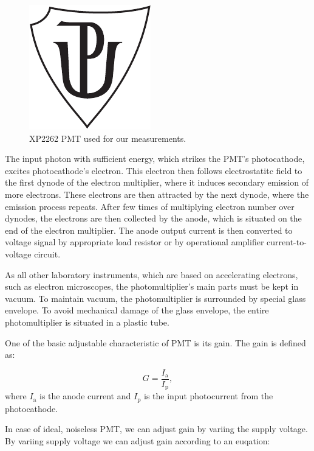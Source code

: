 \begin{figure}[H]
 \centering
 \includegraphics{up_logo_bw}
 \caption{XP2262 PMT used for our measurements.}
 \label{XP2262 PMT}
\end{figure}

\par
The input photon with sufficient energy, which strikes the PMT's photocathode, excites photocathode's electron. This electron then follows electrostatitc field to the first dynode of the electron multiplier, where it induces secondary emission of more electrons. These electrons are then attracted by the next dynode, where the emission process repeats. After few times of multiplying electron number over dynodes, the electrons are then collected by 
the anode, which is situated on the end of the electron multiplier. The anode output current is then converted to voltage signal by appropriate load resistor or by operational amplifier current-to-voltage circuit.
\par
As all other laboratory instruments, which are based on accelerating electrons, such as electron microscopes, the photomultiplier's main parts must be kept in vacuum. To maintain vacuum, the photomultiplier is surrounded by special glass envelope. To avoid mechanical damage of the glass envelope, the entire photomultiplier is situated in a plastic tube.
\par
One of the basic adjustable characteristic of PMT is its gain. The gain is defined as:

\begin{equation}
G = \frac{I_\textrm{a}}{I_\textrm{p}},
\end{equation}
where $I_\textrm{a}$ is the anode current and $I_\textrm{p}$ is the input photocurrent from the photocathode.
\par
In case of ideal, noiseless PMT, we can adjust gain by variing the supply voltage. By variing supply voltage we can adjust gain according to an euqation:

